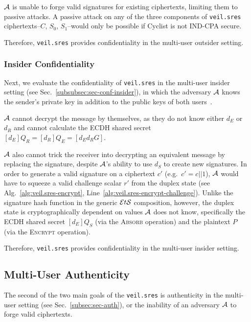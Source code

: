 $\mathcal{A}$ is unable to forge valid signatures for existing ciphertexts, limiting them to passive attacks.
A passive attack on any of the three components of \texttt{veil.sres} ciphertexts--$C$, $S_0$, $S_1$--would only be
possible if Cyclist is not IND-CPA secure.

Therefore, \texttt{veil.sres} provides confidentiality in the multi-user outsider setting.

\subsubsection{Insider Confidentiality}

Next, we evaluate the confidentiality of \texttt{veil.sres} in the multi-user insider setting
(see Sec.~\ref{subsubsec:sec-conf-insider}), in which the adversary $\mathcal{A}$ knows the sender's private key in
addition to the public keys of both users~\cite[p. 45--46]{baek2010}.

$\mathcal{A}$ cannot decrypt the message by themselves, as they do not know either $d_E$ or $d_R$ and cannot calculate
the ECDH shared secret $[d_E]Q_R=[d_R]Q_E=[d_E{d_R}G]$.

$\mathcal{A}$ also cannot trick the receiver into decrypting an equivalent message by replacing the signature, despite
$\mathcal{A}$'s ability to use $d_S$ to create new signatures.
In order to generate a valid signature on a ciphertext $c'$ (e.g.\ $c'=c||1$), $\mathcal{A}$ would have to squeeze a
valid challenge scalar $r'$ from the duplex state (see Alg.~\ref{alg:veil.sres-encrypt},
Line~\ref{alg:veil.sres-encrypt-challenge}).
Unlike the signature hash function in the generic $\mathcal{E}t\mathcal{S}$ composition, however, the duplex state is cryptographically
dependent on values $\mathcal{A}$ does not know, specifically the ECDH shared secret $[d_E]Q_S$ (via the \textsc{Absorb}
operation) and the plaintext $P$ (via the \textsc{Encrypt} operation).

Therefore, \texttt{veil.sres} provides confidentiality in the multi-user insider setting.

\subsection{Multi-User Authenticity}\label{subsec:veil.sres-auth}

The second of the two main goals of the \texttt{veil.sres} is authenticity in the multi-user setting
(see Sec.~\ref{subsec:sec-auth}), or the inability of an adversary $\mathcal{A}$ to forge valid ciphertexts.

